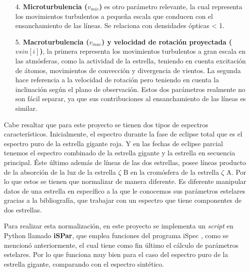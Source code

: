 \documentclass[12pt,oneside,openany,letter]{book}
\begin{document}
\begin{itemize}
    \item[4.] \textbf{Microturbulencia ($v_{mic}$)} es otro parámetro relevante, la cual representa los movimientos turbulentos a pequeña escala que conducen con el ensanchamiento de las líneas. Se relaciona con densidades ópticas < 1.
    \item[5.] \textbf{Macroturbulencia ($v_{mac}$) y velocidad de rotación proyectada ($v sin[i]$)}, la  primera representa los movimientos turbulentos a gran escala en las atmósferas, como la actividad de la estrella, teniendo en cuenta excitación de átomos, movimientos de convección y divergencia de vientos. La segunda hace referencia a la velocidad de rotación pero teniendo en cuenta la inclinación según el plano de observación. Estos dos parámetros realmente no son fácil separar, ya que sus contribuciones al ensanchamiento de las líneas es similar.
\end{itemize}


\noindent Cabe resaltar que para este proyecto se tienen dos tipos de espectros característicos. Inicialmente, el espectro durante la fase de eclipse total que es el espectro puro de la estrella gigante roja. Y en las fechas de eclipse parcial tenemos el espectro combinado de la estrella gigante y la estrella en secuencia principal. Éste último además de líneas de las dos estrellas, posee líneas producto de la absorción de la luz de la estrella $\zeta$ B en la cromósfera de la estrella $\zeta$ A. Por lo que estos se tienen que normalizar de manera diferente. Es diferente manipular datos de una estrella en específico a la que le conocemos sus parámetros estelares gracias a la bibliografía, que trabajar con un espectro que tiene componentes de dos estrellas.


Para realizar esta normalización, en este proyecto se implementa un \textit{script} en Python llamado \textbf{iSPar}, que emplea funciones del programa iSpec \citep{blanco2019modern}, como se mencionó anteriormente, el cual tiene como fin último el cálculo de parámetros estelares. Por lo que funciona muy bien para el caso del espectro puro de la estrella gigante, comparando con el espectro sintético.
\end{document}
